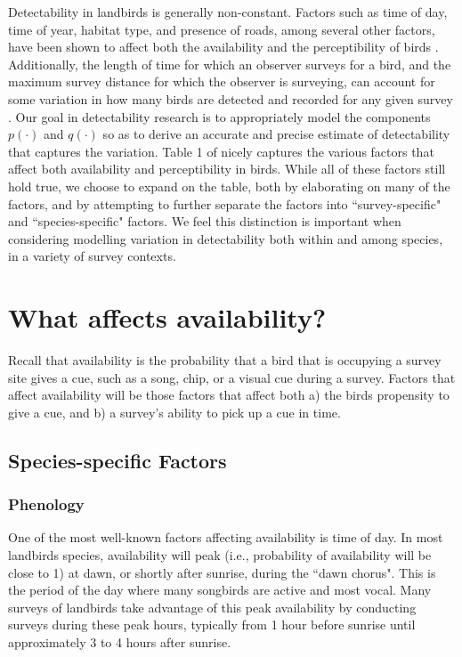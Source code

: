 \par Detectability in landbirds is generally non-constant. 
Factors such as time of day, time of year, habitat type, and presence of roads, among several other factors, have been shown to affect both the availability and the perceptibility of birds \citep{wilson_reliability_1985, solymos_calibrating_2013, johnston_species_2014, cooke_road_2020}. 
Additionally, the length of time for which an observer surveys for a bird, and the maximum survey distance for which the observer is surveying, can account for some variation in how many birds are detected and recorded for any given survey \citep{alldredge_factors_2007, solymos_calibrating_2013, buckland_distance_2015}.  
Our goal in detectability research is to appropriately model the components $p(\cdot)$ and $q(\cdot)$ so as to derive an accurate and precise estimate of detectability that captures the variation.
Table 1 of \citet{johnson_defense_2008} nicely captures the various factors that affect both availability and perceptibility in birds.
While all of these factors still hold true, we choose to expand on the table, both by elaborating on many of the factors, and by attempting to further separate the factors into ``survey-specific" and ``species-specific" factors.
We feel this distinction is important when considering modelling variation in detectability both within and among species, in a variety of survey contexts.

\section{What affects availability?}

\par Recall that availability is the probability that a bird that is occupying a survey site gives a cue, such as a song, chip, or a visual cue during a survey.
Factors that affect availability will be those factors that affect both a) the birds propensity to give a cue, and b) a survey's ability to pick up a cue in time.

\subsection{Species-specific Factors}
\subsubsection{Phenology}
\par One of the most well-known factors affecting availability is time of day.
In most landbirds species, availability will peak (i.e., probability of availability will be close to 1) at dawn, or shortly after sunrise, during the ``dawn chorus".
This is the period of the day where many songbirds are active and most vocal.
Many surveys of landbirds take advantage of this peak availability by conducting surveys during these peak hours, typically from 1 hour before sunrise until approximately 3 to 4 hours after sunrise.

